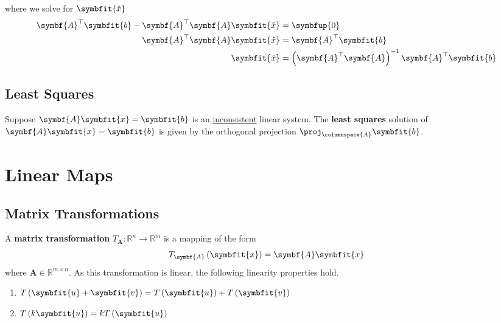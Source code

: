 \documentclass{article}
\begin{document}
\begin{solution}[Proof]
\begin{equation*}
    \end{equation*}
    where we solve for \(\symbfit{\hat{x}}\)
    \begin{align*}
        \symbf{A}^\top \symbfit{b}-\symbf{A}^\top \symbf{A}\symbfit{\hat{x}} & = \symbfup{0}                                                            \\
        \symbf{A}^\top \symbf{A}\symbfit{\hat{x}}                            & = \symbf{A}^\top \symbfit{b}                                             \\
        \symbfit{\hat{x}}                                                    & = \left( \symbf{A}^\top \symbf{A} \right)^{-1}\symbf{A}^\top \symbfit{b}
    \end{align*}
\end{solution}
\subsection{Least Squares}
\begin{theorem}
    Suppose \(\symbf{A}\symbfit{x}=\symbfit{b}\) is an
    \underline{inconsistent} linear system. The \textbf{least squares}
    solution of \(\symbf{A}\symbfit{x}=\symbfit{b}\) is given by the
    orthogonal projection \(\proj_{\columnspace{A}}\symbfit{b}\).
\end{theorem}
\newpage
\section{Linear Maps}
\subsection{Matrix Transformations}
\begin{definition}
    A \textbf{matrix transformation}
    \(T_{\symbf{A}}:\mathbb{R}^n\rightarrow \mathbb{R}^m\) is a
    mapping of the form
    \begin{equation*}
        T_{\symbf{A}}\left(\symbfit{x}\right) = \symbf{A}\symbfit{x}
    \end{equation*}
    where \(\symbf{A}\in \mathbb{R}^{m \times n}\). As this
    transformation is linear, the following linearity properties hold.
    \begin{enumerate}
        \item \(T\left(\symbfit{u}+\symbfit{v}\right)=T\left(\symbfit{u}\right) + T\left(\symbfit{v}\right)\)
        \item \(T\left(k\symbfit{u}\right)= kT\left(\symbfit{u}\right)\)
    \end{enumerate}
\end{definition}
\end{document}
